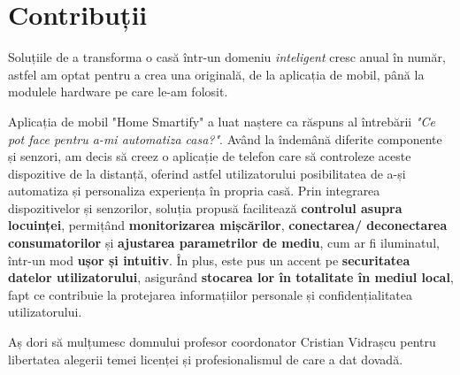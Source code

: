 \chapter*{Contribuții}
Soluțiile de a transforma o casă într-un domeniu \emph{inteligent} cresc anual în număr, astfel am optat pentru a crea una originală, de la aplicația de mobil, până la modulele hardware pe care le-am folosit.

Aplicația de mobil "Home Smartify" a luat naștere ca răspuns al întrebării \emph{"Ce pot face pentru a-mi automatiza casa?"}. Având la îndemână diferite componente și senzori, am decis să creez o aplicație de telefon care să controleze aceste dispozitive de la distanță, oferind astfel utilizatorului posibilitatea de a-și automatiza și personaliza experiența în propria casă. Prin integrarea dispozitivelor și senzorilor, soluția propusă facilitează \textbf{controlul asupra locuinței}, permițând \textbf{monitorizarea mișcărilor}, \textbf{conectarea/ deconectarea consumatorilor} și \textbf{ajustarea parametrilor de mediu}, cum ar fi iluminatul, într-un mod \textbf{ușor și intuitiv}. În plus, este pus un accent pe \textbf{securitatea datelor utilizatorului}, asigurând \textbf{stocarea lor în totalitate în mediul local}, fapt ce contribuie la protejarea informațiilor personale și confidențialitatea utilizatorului.

Aș dori să mulțumesc domnului profesor coordonator Cristian Vidrașcu pentru libertatea alegerii temei licenței și profesionalismul de care a dat dovadă.
